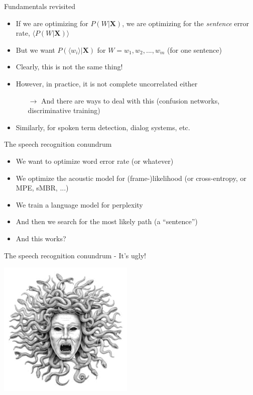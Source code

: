\begin{frame}{Fundamentals revisited}
  \begin{itemize}
  \item If we are optimizing for $P(W|\boldsymbol{X})$,
    we are optimizing for the \textit{sentence} error rate, $\langle P(W|\boldsymbol{X}) \rangle$
  \item But we want $P(\langle w_i \rangle|\boldsymbol{X})$ for $W=w_1,w_2, ..., w_m$ (for one sentence)
  \item Clearly, this is not the same thing!
  \item However, in practice, it is not complete uncorrelated either
    \begin{itemize}
    \item[$\rightarrow$] And there are ways to deal with this (confusion networks, discriminative training)
    \end{itemize}
  \item Similarly, for spoken term detection, dialog systems, etc.
  \end{itemize}
\end{frame}

\begin{frame}{The speech recognition conundrum}
  \begin{itemize}
  \item We want to optimize word error rate (or whatever)\\
    \vspace{1cm}
  \item We optimize the acoustic model for (frame-)likelihood (or cross-entropy, or MPE, sMBR, ...)
  \item We train a language model for perplexity
  \item And then we search for the most likely path (a ``sentence'')
  \item And this works?
  \end{itemize}
\end{frame}

\begin{frame}{The speech recognition conundrum - It's ugly!}
  \begin{center}
    \includegraphics[height=65mm]{figures/medusa}
  \end{center}
\end{frame}

